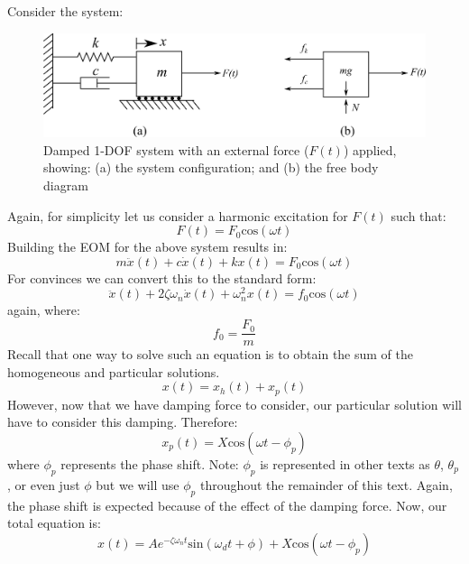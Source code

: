 \documentclass[12pt,letter]{article}
\numberwithin{ex}{section} %
\numberwithin{re}{section} %
\begin{document}
			Consider the system:
			\begin{figure}[H]
				\centering
				\includegraphics[]{../Figures/1-DOF-spring_dashpot_mass_horizontal_forced_FBD.png}
				\caption{Damped 1-DOF system with an external force ($F(t)$) applied, showing: (a) the system configuration; and (b) the free body diagram}
			\end{figure}	
			\noindent Again, for simplicity let us consider a harmonic excitation for $F(t)$ such that:
			\begin{equation}
				F(t) = F_0\text{cos}(\omega t)
			\end{equation}							
			Building the EOM for the above system results in:
			\begin{equation}
				m \ddot{x}(t)+c\dot{x}(t)+kx(t) = F_0\text{cos}(\omega t)
			\end{equation}			
			For convinces we can convert this to the standard form:					
			\begin{equation}
				\ddot{x}(t)+2 \zeta \omega_n \dot{x}(t) +\omega_n^2x(t) = f_0\text{cos}(\omega t)
			\end{equation}					
			again, where:
			\begin{equation}
				f_0 = \frac{F_0}{m}
			\end{equation}	
			Recall that one way to solve such an equation is to obtain the sum of the homogeneous and particular solutions. 
			\begin{equation}
				x(t) = x_h(t) + x_p(t)
			\end{equation}	
			However, now that we have damping force to consider, our particular solution will have to consider this damping. Therefore:
			\begin{equation}
				x_p(t) = X \text{cos}(\omega t - \phi_p)
			\end{equation}
			where $\phi_p$ represents the phase shift. Note: $\phi_p$ is represented in other texts as $\theta$, $\theta_p$, or even just $\phi$ but we will use $\phi_p$ throughout the remainder of this text. Again, the phase shift is expected because of the effect of the damping force. Now, our total equation is:
			\begin{equation}
				x(t) = Ae^{-\zeta \omega_n t}\text{sin}(\omega_d t + \phi) +  X \text{cos}(\omega t - \phi_p)
			\end{equation}			
\end{document}

